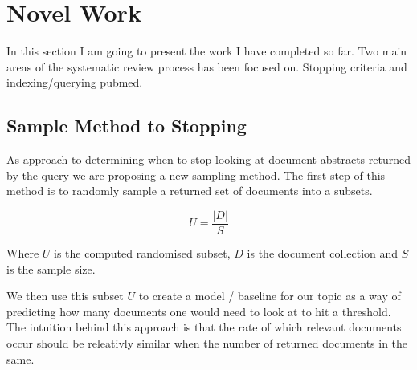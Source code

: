 \chapter{Novel Work}

In this section I am going to present the work I have completed so far. Two main areas of the systematic review process has been focused on. Stopping criteria and indexing/querying pubmed.

\section{Sample Method to Stopping}

As approach to determining when to stop looking at document abstracts returned by the query we are proposing a new sampling method. The first step of this method is to randomly sample a returned set of documents into a subsets.

\begin{equation}
U = \frac{|D|}{S}
\end{equation}

Where $U$ is the computed randomised subset, $D$ is the document collection and $S$ is the sample size.

We then use this subset $U$ to create a model / baseline for our topic as a way of predicting how many documents one would need to look at to hit a threshold. The intuition behind this approach is that the rate of which relevant documents occur should be releativly similar when the number of returned documents in the same.

